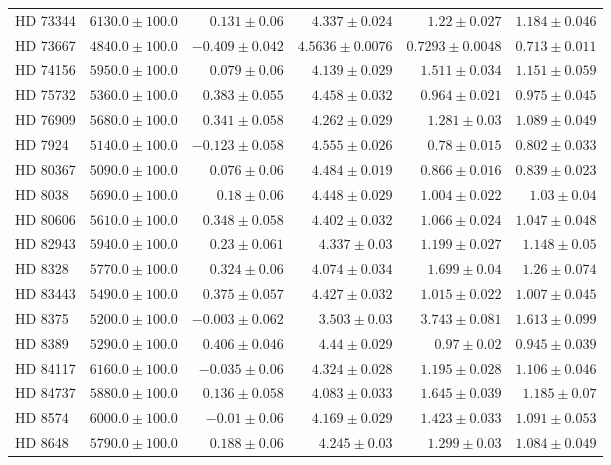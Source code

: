 \begin{longtable*}{lrrrrr}
HD 73344 & $6130.0\pm 100.0$ & $0.131\pm 0.06$ & $4.337\pm 0.024$ & $1.22\pm 0.027$ & $1.184\pm 0.046$ \\ 
HD 73667 & $4840.0\pm 100.0$ & $-0.409\pm 0.042$ & $4.5636\pm 0.0076$ & $0.7293\pm 0.0048$ & $0.713\pm 0.011$ \\ 
HD 74156 & $5950.0\pm 100.0$ & $0.079\pm 0.06$ & $4.139\pm 0.029$ & $1.511\pm 0.034$ & $1.151\pm 0.059$ \\ 
HD 75732 & $5360.0\pm 100.0$ & $0.383\pm 0.055$ & $4.458\pm 0.032$ & $0.964\pm 0.021$ & $0.975\pm 0.045$ \\ 
HD 76909 & $5680.0\pm 100.0$ & $0.341\pm 0.058$ & $4.262\pm 0.029$ & $1.281\pm 0.03$ & $1.089\pm 0.049$ \\ 
HD 7924 & $5140.0\pm 100.0$ & $-0.123\pm 0.058$ & $4.555\pm 0.026$ & $0.78\pm 0.015$ & $0.802\pm 0.033$ \\ 
HD 80367 & $5090.0\pm 100.0$ & $0.076\pm 0.06$ & $4.484\pm 0.019$ & $0.866\pm 0.016$ & $0.839\pm 0.023$ \\ 
HD 8038 & $5690.0\pm 100.0$ & $0.18\pm 0.06$ & $4.448\pm 0.029$ & $1.004\pm 0.022$ & $1.03\pm 0.04$ \\ 
HD 80606 & $5610.0\pm 100.0$ & $0.348\pm 0.058$ & $4.402\pm 0.032$ & $1.066\pm 0.024$ & $1.047\pm 0.048$ \\ 
HD 82943 & $5940.0\pm 100.0$ & $0.23\pm 0.061$ & $4.337\pm 0.03$ & $1.199\pm 0.027$ & $1.148\pm 0.05$ \\ 
HD 8328 & $5770.0\pm 100.0$ & $0.324\pm 0.06$ & $4.074\pm 0.034$ & $1.699\pm 0.04$ & $1.26\pm 0.074$ \\ 
HD 83443 & $5490.0\pm 100.0$ & $0.375\pm 0.057$ & $4.427\pm 0.032$ & $1.015\pm 0.022$ & $1.007\pm 0.045$ \\ 
HD 8375 & $5200.0\pm 100.0$ & $-0.003\pm 0.062$ & $3.503\pm 0.03$ & $3.743\pm 0.081$ & $1.613\pm 0.099$ \\ 
HD 8389 & $5290.0\pm 100.0$ & $0.406\pm 0.046$ & $4.44\pm 0.029$ & $0.97\pm 0.02$ & $0.945\pm 0.039$ \\ 
HD 84117 & $6160.0\pm 100.0$ & $-0.035\pm 0.06$ & $4.324\pm 0.028$ & $1.195\pm 0.028$ & $1.106\pm 0.046$ \\ 
HD 84737 & $5880.0\pm 100.0$ & $0.136\pm 0.058$ & $4.083\pm 0.033$ & $1.645\pm 0.039$ & $1.185\pm 0.07$ \\ 
HD 8574 & $6000.0\pm 100.0$ & $-0.01\pm 0.06$ & $4.169\pm 0.029$ & $1.423\pm 0.033$ & $1.091\pm 0.053$ \\ 
HD 8648 & $5790.0\pm 100.0$ & $0.188\pm 0.06$ & $4.245\pm 0.03$ & $1.299\pm 0.03$ & $1.084\pm 0.049$ \\ 

\end{longtable*}
